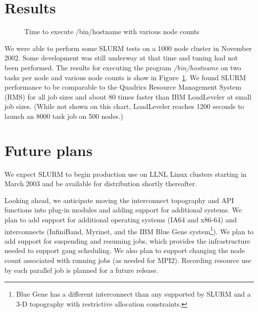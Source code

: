 \documentclass{article}
\begin{document}
\section{Results}

\begin{figure}[htb]
\centerline{}
\caption{Time to execute /bin/hostname with various node counts}
\label{timing}
\end{figure}

We were able to perform some SLURM tests on a 1000 node cluster in 
November 2002. Some development was still underway at that time and 
tuning had not been performed. The results for executing the program 
{\em /bin/hostname} on two tasks per node and various node counts is show 
in Figure~\ref{timing}. We found SLURM performance to be comparable 
to the Quadrics Resource Management System (RMS)\cite{Quadrics2002} 
for all job sizes and about 80 times faster than IBM 
LoadLeveler\cite{LL2002} at small job sizes.
(While not shown on this chart, LoadLeveler reaches 1200 seconds to 
launch an 8000 task job on 500 nodes.)

\section{Future plans}

We expect SLURM to begin production use on LLNL Linux clusters 
starting in March 2003 and be available for distribution shortly 
thereafter. 

Looking ahead, we anticipate moving the interconnect topography 
and API functions into plug-in modules and adding support for 
additional systems. 
We plan to add support for additional operating systems 
(IA64 and x86-64) and interconnects (InfiniBand, Myrinet, and 
the IBM Blue Gene\cite{BlueGene2002} system\footnote{Blue Gene 
has a different interconnect than any supported by SLURM and 
a 3-D topography with restrictive allocation constraints.}). 
We plan to add support for suspending and resuming jobs, which 
provides the infrastructure needed to support gang scheduling. 
We also plan to support changing the node count associated 
with running jobs (as needed for MPI2). 
Recording resource use by each parallel job is planned for a 
future release.



\end{document}
